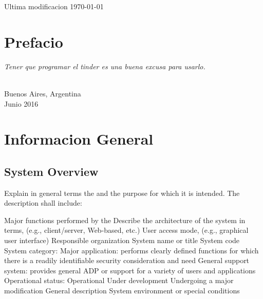 \documentclass[10pt,letterpaper,extrafontsizes]{memoir}
\begin{document}
Ultima modificacion \today


\endgroup

\clearpage
\vspace*{\fill}

\pagestyle{headings}

\tableofcontents
\vspace*{\fill}
\clearpage
\listoffigures
\clearpage
\listoftables
\clearpage

\chapter{Prefacio}

    \textit{Tener que programar el tinder es una buena excusa para usarlo.}\\

{ \\ Buenos Aires, Argentina\\ Junio 2016\par}

\mainmatter

\chapter{Informacion General} \label{chap:infogeneral}

\section{System Overview}

Explain in general terms the  and the purpose for which it is intended.  The description shall include: 

Major functions performed by the 
Describe the architecture of the system in  terms, (e.g., client/server, Web-based, etc.)
User access mode, (e.g., graphical user interface)
Responsible organization
System name or title
System code
System category:
Major application:  performs clearly defined functions for which there is a readily identifiable security consideration and need
General support system:  provides general ADP or  support for a variety of users and applications
Operational status:
Operational
Under development
Undergoing a major modification
General description
System environment or special conditions
\end{document}
